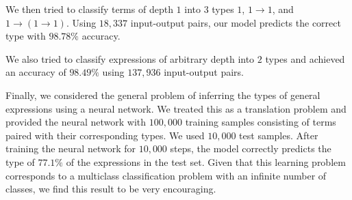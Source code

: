 \documentclass[twocolumn,9pt]{article}
\theoremstyle{definition}
\theoremstyle{remark}
\numberwithin{equation}{section}
\begin{document}
We then tried to classify terms of depth $1$ into $3$ types $1$, $1 \to
1$, and $1 \to (1 \to 1)$. Using $18,337$ input-output pairs, our model
predicts the correct type with $98.78\%$ accuracy.

We also tried to classify expressions of arbitrary depth into $2$ types
and achieved an accuracy of $98.49\%$ using $137,936$ input-output
pairs.

Finally, we considered the general problem of inferring the types of
general expressions using a neural network. We treated this as a
translation problem and provided the neural network with $100,000$
training samples consisting of terms paired with their corresponding
types. We used $10,000$ test samples. After training the neural network
for $10,000$ steps, the model correctly predicts the type of $77.1\%$ of
the expressions in the test set. Given that this learning problem
corresponds to a multiclass classification problem with an infinite
number of classes, we find this result to be very encouraging.



\end{document}
